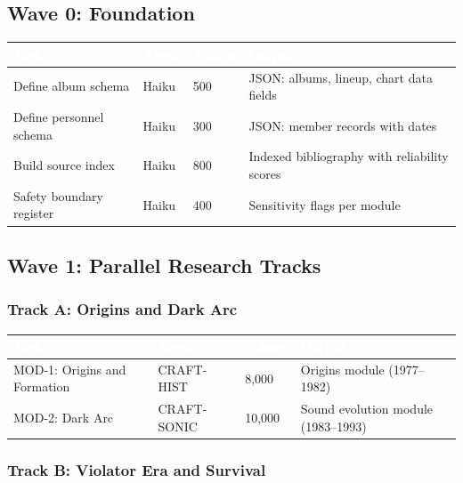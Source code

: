 \documentclass[11pt,letterpaper]{article}
\newcommand{\tableheader}[1]{\textbf{\sffamily\textcolor{white}{#1}}}
\begin{document}
\subsection{Wave 0: Foundation}

\begin{center}
\begin{tabularx}{\textwidth}{L{3cm}L{2cm}C{1.5cm}X}
\toprule
{}
\tableheader{Task} & \tableheader{Agent} & \tableheader{Tokens} & \tableheader{Output} \\
\midrule
Define album schema & Haiku & 500 & JSON: albums, lineup, chart data fields \\
Define personnel schema & Haiku & 300 & JSON: member records with dates \\
Build source index & Haiku & 800 & Indexed bibliography with reliability scores \\
Safety boundary register & Haiku & 400 & Sensitivity flags per module \\
\bottomrule
\end{tabularx}
\end{center}

\subsection{Wave 1: Parallel Research Tracks}

\subsubsection*{Track A: Origins and Dark Arc}

\begin{center}
\begin{tabularx}{\textwidth}{L{3.5cm}L{2cm}C{1.5cm}X}
\toprule
{}
\tableheader{Task} & \tableheader{Agent} & \tableheader{Tokens} & \tableheader{Output} \\
\midrule
MOD-1: Origins and Formation & CRAFT-HIST & 8,000 & Origins module (1977--1982) \\
MOD-2: Dark Arc & CRAFT-SONIC & 10,000 & Sound evolution module (1983--1993) \\
\bottomrule
\end{tabularx}
\end{center}

\subsubsection*{Track B: Violator Era and Survival}
\end{document}

